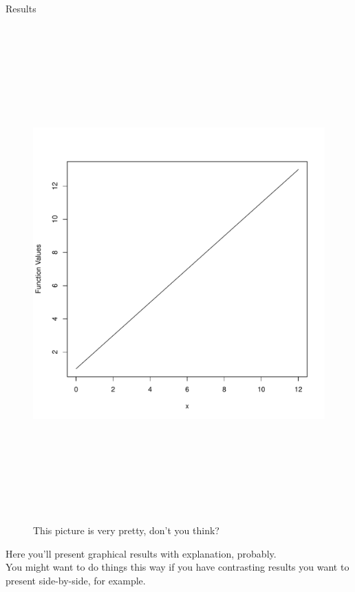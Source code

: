 \documentclass[final,t]{beamer}
\begin{document}
\begin{frame}[fragile]
\begin{columns}[t]
    \begin{column}{0.32\linewidth}

      \begin{block}{Results}   
      \begin{multicols}{2}
      \vspace{-30pt}
        \begin{figure}[htb]
        \includegraphics[height=7.5in, width=1.05\columnwidth]{myprettypicture.pdf}
         \caption{This picture is very pretty, don't you think?}
        \end{figure}
              Here you'll present graphical results with explanation, probably. \\
              \vspace{15pt}
              You might want to do things this way if you have contrasting results you want to present side-by-side, for example.
        \end{multicols}
      \end{block}



\end{column}
\end{columns}
\end{frame}
\end{document}
